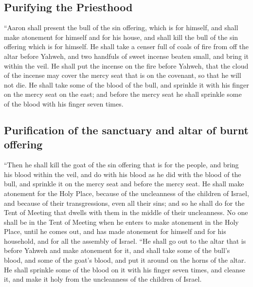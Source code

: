 \hypertarget{purifying-the-priesthood}{%
\subsection{Purifying the Priesthood}\label{purifying-the-priesthood}}

 ``Aaron shall present the bull of the sin offering,
which is for himself, and shall make atonement for himself and for his
house, and shall kill the bull of the sin offering which is for himself.
 He shall take a censer full of coals of fire from off
the altar before Yahweh, and two handfuls of sweet incense beaten small,
and bring it within the veil.  He shall put the incense
on the fire before Yahweh, that the cloud of the incense may cover the
mercy seat that is on the covenant, so that he will not die.
 He shall take some of the blood of the bull, and
sprinkle it with his finger on the mercy seat on the east; and before
the mercy seat he shall sprinkle some of the blood with his finger seven
times.

\hypertarget{purification-of-the-sanctuary-and-altar-of-burnt-offering}{%
\subsection{Purification of the sanctuary and altar of burnt
offering}\label{purification-of-the-sanctuary-and-altar-of-burnt-offering}}

 ``Then he shall kill the goat of the sin offering that
is for the people, and bring his blood within the veil, and do with his
blood as he did with the blood of the bull, and sprinkle it on the mercy
seat and before the mercy seat.  He shall make atonement
for the Holy Place, because of the uncleanness of the children of
Israel, and because of their transgressions, even all their sins; and so
he shall do for the Tent of Meeting that dwells with them in the middle
of their uncleanness.  No one shall be in the Tent of
Meeting when he enters to make atonement in the Holy Place, until he
comes out, and has made atonement for himself and for his household, and
for all the assembly of Israel.  ``He shall go out to the
altar that is before Yahweh and make atonement for it, and shall take
some of the bull's blood, and some of the goat's blood, and put it
around on the horns of the altar.  He shall sprinkle some
of the blood on it with his finger seven times, and cleanse it, and make
it holy from the uncleanness of the children of Israel.

